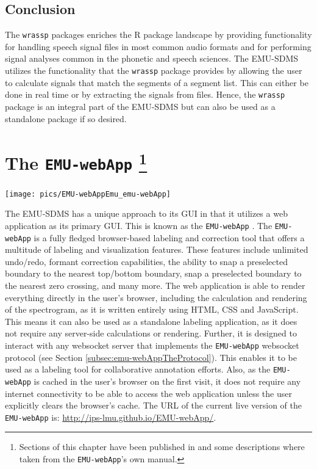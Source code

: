 \documentclass[]{book}
\let\rmarkdownfootnote\footnote%
\def\footnote{\protect\rmarkdownfootnote}
\begin{document}
\hypertarget{conclusion-4}{%
\section{Conclusion}\label{conclusion-4}}

The \texttt{wrassp} packages enriches the R package landscape by providing functionality for handling speech signal files in most common audio formats and for performing signal analyses common in the phonetic and speech sciences. The EMU-SDMS utilizes the functionality that the \texttt{wrassp} package provides by allowing the user to calculate signals that match the segments of a segment list. This can either be done in real time or by extracting the signals from files. Hence, the \texttt{wrassp} package is an integral part of the EMU-SDMS but can also be used as a standalone package if so desired.

\hypertarget{chap:emu-webApp}{%
\chapter[The \texttt{EMU-webApp} ]{\texorpdfstring{The \texttt{EMU-webApp} \footnote{Sections of this chapter have been published in \citep{winkelmann:2015d} and some descriptions where taken from the \texttt{EMU-webApp}'s own manual.}}{The EMU-webApp }}\label{chap:emu-webApp}}

\begin{center}\texttt{[image: pics/EMU-webAppEmu\_emu-webApp]} \end{center}

The EMU-SDMS has a unique approach to its GUI in that it utilizes a web application as its primary GUI. This is known as the \texttt{EMU-webApp} \citep{winkelmann:2015d}. The \texttt{EMU-webApp} is a fully fledged browser-based labeling and correction tool that offers a multitude of labeling and visualization features. These features include unlimited undo/redo, formant correction capabilities, the ability to snap a preselected boundary to the nearest top/bottom boundary, snap a preselected boundary to the nearest zero crossing, and many more. The web application is able to render everything directly in the user's browser, including the calculation and rendering of the spectrogram, as it is written entirely using HTML, CSS and JavaScript. This means it can also be used as a standalone labeling application, as it does not require any server-side calculations or rendering. Further, it is designed to interact with any websocket server that implements the \texttt{EMU-webApp} websocket protocol (see Section \ref{subsec:emu-webAppTheProtocol}). This enables it to be used as a labeling tool for collaborative annotation efforts. Also, as the \texttt{EMU-webApp} is cached in the user's browser on the first visit, it does not require any internet connectivity to be able to access the web application unless the user explicitly clears the browser's cache. The URL of the current live version of the \texttt{EMU-webApp} is: \url{http://ips-lmu.github.io/EMU-webApp/}.
\end{document}
